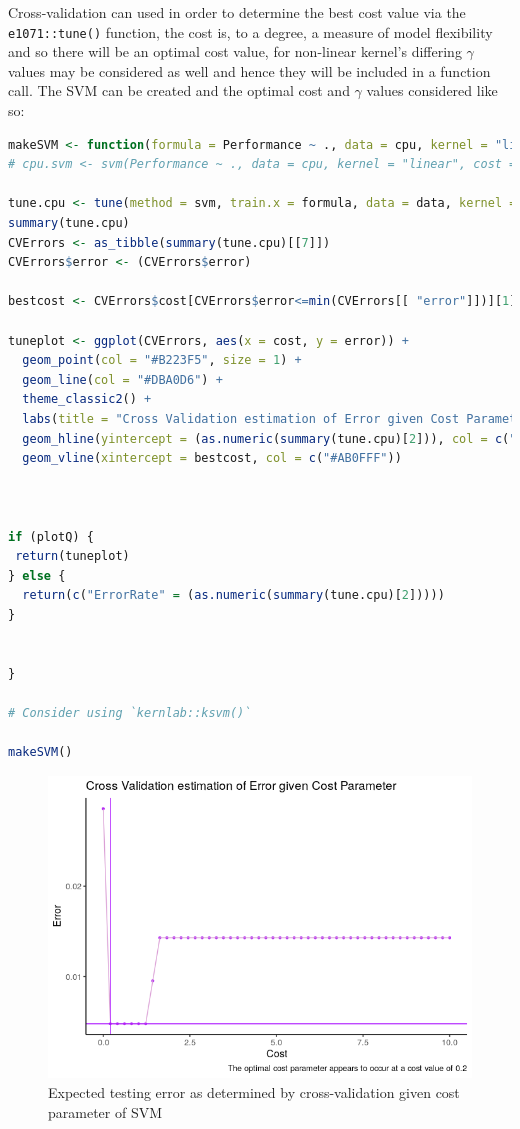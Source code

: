 \documentclass[
]{article}
\newcommand{\passthrough}[1]{#1}
\begin{document}
Cross-validation can used in order to determine the best cost value via
the \passthrough{\lstinline!e1071::tune()!} function, the cost is, to a
degree, a measure of model flexibility and so there will be an optimal
cost value, for non-linear kernel's differing $\gamma$ values may be
considered as well and hence they will be included in a function call. The SVM can be created and the optimal cost and $\gamma$ values considered like so:

\begin{lstlisting}[language=R]
makeSVM <- function(formula = Performance ~ ., data = cpu, kernel = "linear", plotQ = TRUE){
# cpu.svm <- svm(Performance ~ ., data = cpu, kernel = "linear", cost = 10, scale = FALSE)

tune.cpu <- tune(method = svm, train.x = formula, data = data, kernel = kernel, ranges = list(cost = seq(from = 0.0001, to = 10, length.out = 50)), gamma = c(0.5, 1, 2, 3, 4))
summary(tune.cpu)
CVErrors <- as_tibble(summary(tune.cpu)[[7]])
CVErrors$error <- (CVErrors$error)

bestcost <- CVErrors$cost[CVErrors$error<=min(CVErrors[[ "error"]])][1]

tuneplot <- ggplot(CVErrors, aes(x = cost, y = error)) +
  geom_point(col = "#B223F5", size = 1) +
  geom_line(col = "#DBA0D6") +
  theme_classic2() +
  labs(title = "Cross Validation estimation of Error given Cost Parameter", y = "Error", x = "Cost", caption = paste("The optimal cost parameter appears to occur at a cost value of", signif(bestcost, 2))) +
  geom_hline(yintercept = (as.numeric(summary(tune.cpu)[2])), col = c("#AB0FFF")) + 
  geom_vline(xintercept = bestcost, col = c("#AB0FFF"))



if (plotQ) {
 return(tuneplot) 
} else {
  return(c("ErrorRate" = (as.numeric(summary(tune.cpu)[2]))))
}


}

# Consider using `kernlab::ksvm()`

makeSVM()
\end{lstlisting}

\begin{figure}
	\centering
	\includegraphics[width=0.7\linewidth]{SecAssignment_files/figure-html/unnamed-chunk-45-1.png}
	\caption{Expected testing error as determined by cross-validation given cost parameter of SVM}
	\label{linsvmcv}
\end{figure}
\end{document}
